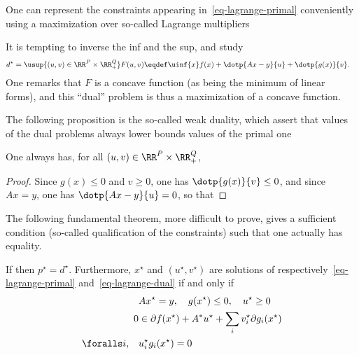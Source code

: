 One can represent the constraints appearing in~\eqref{eq-lagrange-primal} conveniently using a maximization over so-called Lagrange multipliers

It is tempting to inverse the inf and the sup, and study 
\begin{align}\label{eq-lagrange-dual}
	d^\star = \usup{(u,v) \in \RR^P \times \RR_+^Q } F(u,v) &\eqdef \uinf{x}  f(x) + \dotp{Ax-y}{u} + \dotp{g(x)}{v}.
\end{align}
One remarks that $F$ is a concave function (as being the minimum of linear forms), and this ``dual'' problem is thus a maximization of a concave function. 


The following proposition is the so-called weak duality, which assert that values of the dual problems always lower bounds values of the primal one

\begin{prop}
	One always has, for all $(u,v) \in \RR^P \times \RR_+^Q$, %
\end{prop}
\begin{proof}
	Since $g(x) \leq 0 $ and $v \geq 0$, one has $\dotp{g(x)}{v} \leq 0$, and since $Ax=y$, one has $\dotp{Ax-y}{u}=0$, so that 
\end{proof}

The following fundamental theorem, more difficult to prove, gives a sufficient condition (so-called qualification of the constraints) such that one actually has equality.

\begin{thm}\label{thm-strong-duality}
	If 
	then $p^\star=d^\star$. Furthermore, $x^\star$ and $(u^\star,v^\star)$ are  solutions of respectively~\eqref{eq-lagrange-primal} and~\eqref{eq-lagrange-dual} if and only if
	\begin{align}
		\label{eq-lagr-dual-1}  & Ax^\star=y, \quad g(x^\star) \leq 0, \quad u^\star \geq 0 \\
		\label{eq-lagr-dual-2} 0 &\in \partial f(x^\star) + A^*u^\star + \sum_i v_i^\star \partial g_i(x^\star) \\
		\label{eq-lagr-dual-3}  \foralls i, \quad & u_i^\star g_i(x^\star) = 0
	\end{align}
\end{thm}

